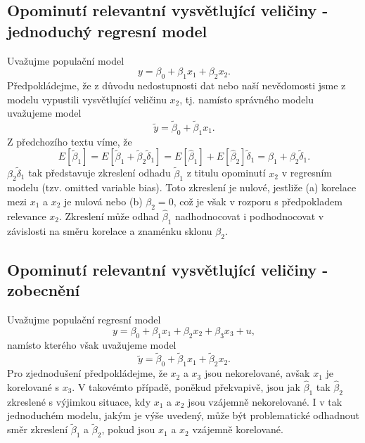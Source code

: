 \subsection{Opominutí relevantní vysvětlující veličiny - jednoduchý regresní model}

Uvažujme populační model
\begin{equation}
y = \beta_0 + \beta_1 x_1 + \beta_2 x_2.
\end{equation}
Předpokládejme, že z důvodu nedostupnosti dat nebo naší nevědomosti jsme z modelu vypustili vysvětlující 
veličinu $x_2$, tj. namísto správného modelu uvažujeme model
\begin{equation}
\tilde{y} = \tilde{\beta}_0 + \tilde{\beta}_1 x_1.
\end{equation}
Z předchozího textu víme, že
\begin{equation}
E[\tilde{\beta}_1] = E[\tilde{\beta}_1 + \tilde{\beta}_2 \tilde{\delta}_1] = E[\hat{\beta}_1] + 
E[\hat{\beta}_2]\tilde{\delta}_1 = \beta_1 + \beta_2 \tilde{\delta}_1.
\end{equation}
$\beta_2 \tilde{\delta}_1$ tak představuje zkreslení odhadu $\tilde{\beta}_1$ z titulu opominutí $x_2$ v 
regresním modelu (tzv. omitted variable bias). Toto zkreslení je nulové, jestliže (a) korelace mezi 
$x_1$ a $x_2$ je nulová nebo (b) $\beta_2 = 0$, což je však v rozporu s předpokladem relevance $x_2$. Zkreslení 
může odhad $\hat{\beta}_1$ nadhodnocovat i podhodnocovat v závislosti na směru korelace a znaménku sklonu $\beta_2$.

\subsection{Opominutí relevantní vysvětlující veličiny - zobecnění}

Uvažujme populační regresní model
\begin{equation}
y = \beta_0 + \beta_1 x_1 + \beta_2 x_2 + \beta_3 x_3 + u,
\end{equation}
namísto kterého však uvažujeme model
\begin{equation}
\tilde{y} = \tilde{\beta}_0 + \tilde{\beta}_1 x_1 + \tilde{\beta}_2 x_2.
\end{equation}
Pro zjednodušení předpokládejme, že $x_2$ a $x_3$ jsou nekorelované, avšak $x_1$ je korelované s $x_3$. V 
takovémto případě, poněkud překvapivě, jsou jak $\hat{\beta}_1$ tak $\hat{\beta}_2$ zkreslené s výjimkou situace, kdy $x_1$ a $x_2$ jsou 
vzájemně nekorelované. I v tak jednoduchém modelu, jakým je výše uvedený, může být problematické odhadnout 
směr zkreslení $\tilde{\beta}_1$ a $\tilde{\beta}_2$, pokud jsou $x_1$ a $x_2$ vzájemně korelované.

